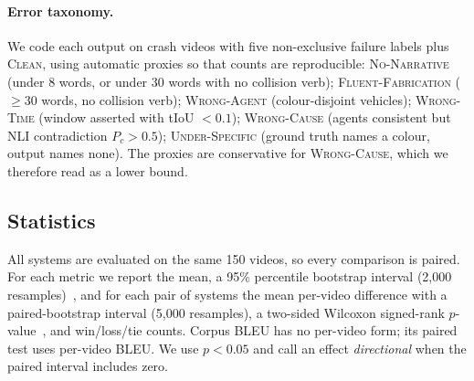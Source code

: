 \paragraph{Error taxonomy.}
\label{sec:taxonomy}
We code each output on crash videos with five non-exclusive failure labels plus \textsc{Clean}, using automatic proxies so that counts are reproducible:
\textsc{No-Narrative} (under 8 words, or under 30 words with no collision verb);
\textsc{Fluent-Fabrication} ($\geq$30 words, no collision verb);
\textsc{Wrong-Agent} (colour-disjoint vehicles);
\textsc{Wrong-Time} (window asserted with tIoU $<0.1$);
\textsc{Wrong-Cause} (agents consistent but NLI contradiction $P_c>0.5$);
\textsc{Under-Specific} (ground truth names a colour, output names none).
The proxies are conservative for \textsc{Wrong-Cause}, which we therefore read as a lower bound.

\subsection{Statistics}
\label{sec:stats}
All systems are evaluated on the same 150 videos, so every comparison is paired.
For each metric we report the mean, a 95\% percentile bootstrap interval (2{,}000 resamples)~\cite{efron1993bootstrap}, and for each pair of systems the mean per-video difference with a paired-bootstrap interval (5{,}000 resamples), a two-sided Wilcoxon signed-rank $p$-value~\cite{wilcoxon1945,dror2018hitchhiker}, and win/loss/tie counts.
Corpus BLEU has no per-video form; its paired test uses per-video BLEU.
We use $p<0.05$ and call an effect \emph{directional} when the paired interval includes zero.
